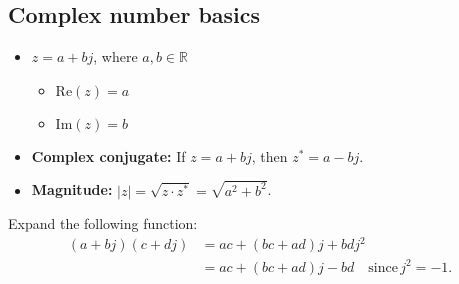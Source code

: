 \subsection{Complex number basics}
\begin{definition}
    \begin{itemize}
        \item \( z = a + bj \), where \( a, b \in \mathbb{R} \)
        \begin{itemize}
            \item \( \text{Re}(z) = a \)
            \item \( \text{Im}(z) = b \)
        \end{itemize}
        
        \item \textbf{Complex conjugate:} If \( z = a + bj \), then \( z^* = a - bj \).
        
        \item \textbf{Magnitude:} \( |z| = \sqrt{z \cdot z^*} = \sqrt{a^2 + b^2} \).
    \end{itemize}

        \begin{center}
        \end{center}

\end{definition}

    \begin{example} 
        Expand the following function:
        \begin{align*}
            (a + bj)(c + dj) &= ac + (bc + ad)j + bdj^2 \\
            &= ac + (bc + ad)j - bd \quad \text{since} \, j^2 = -1.
        \end{align*}
    \end{example}


